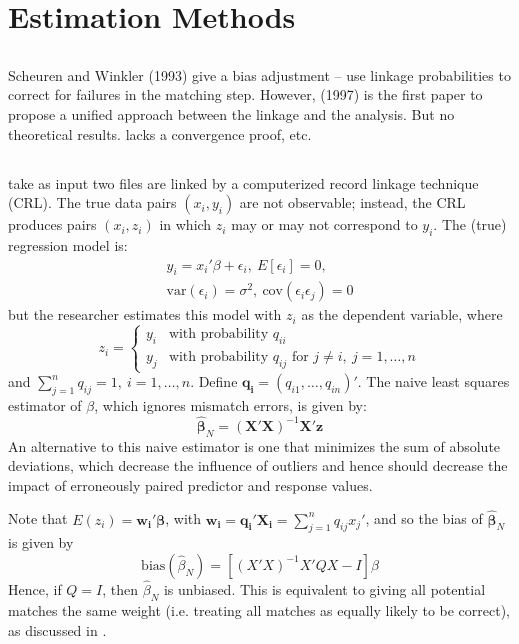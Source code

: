 \documentclass[12pt]{article}
\begin{document}
\section{Estimation Methods}

\subsection{\cite{sw1993, sw1997}}

Scheuren and Winkler (1993) give a bias adjustment -- use linkage probabilities to correct for failures in the matching step.  However, \cite{sw1997} (1997) is the first paper to propose a unified approach between the linkage and the analysis.  But no theoretical results. lacks a convergence proof, etc. 

\subsection{\cite{lahiri05}}
\cite{lahiri05} take as input two files are linked by a computerized record linkage technique (CRL).  The true data pairs $(x_i, y_i)$ are not observable; instead, the CRL produces pairs $(x_i, z_i)$ in which $z_i$ may or may not correspond to $y_i$.  The (true) regression model is:
\begin{gather*}y_i = x_i'\beta + \epsilon_i,\ E[\epsilon_i] = 0,\\ \text{var}(\epsilon_i) = \sigma^2,\ \text{cov}(\epsilon_i \epsilon_j) = 0 \end{gather*}
but the researcher estimates this model with $z_i$ as the dependent variable, where $$z_i = \begin{cases} y_i & \text{with probability $q_{ii}$} \\ y_j & \text{with probability $q_{ij}$ for $j\neq i,\ j = 1,\dots,n $} \end{cases}$$ 
and $\sum_{j=1}^n q_{ij} = 1, \ i=1,\dots, n$.  Define $\mathbf{q_i} = (q_{i1}, \dots, q_{in})'$.  The naive least squares estimator of $\beta$, which ignores mismatch errors, is given by:
$$\hat{\mathbf{\beta}}_N = (\mathbf{X'X})^{-1} \mathbf{X'z} $$ 
An alternative to this naive estimator is one that minimizes the sum of absolute deviations, which decrease the influence of outliers and hence should decrease the impact of erroneously paired predictor and response values.  

Note that $E(z_i) = \mathbf{w_i'\beta}$, with $\mathbf{w_i = q_i'X_i} = \sum_{j=1}^n q_{ij} x_j' $, and so the bias of $\hat{\mathbf{\beta}}_N $ is given by
$$\text{bias}(\hat{\beta}_N) = [(X'X)^{-1} X'QX - I] \beta $$ 
Hence, if $Q = I$, then $\hat{\beta}_N$ is unbiased.  This is equivalent to giving all potential matches the same weight (i.e. treating all matches as equally likely to be correct), as discussed in \cite{ahl2019}.  
\end{document}
